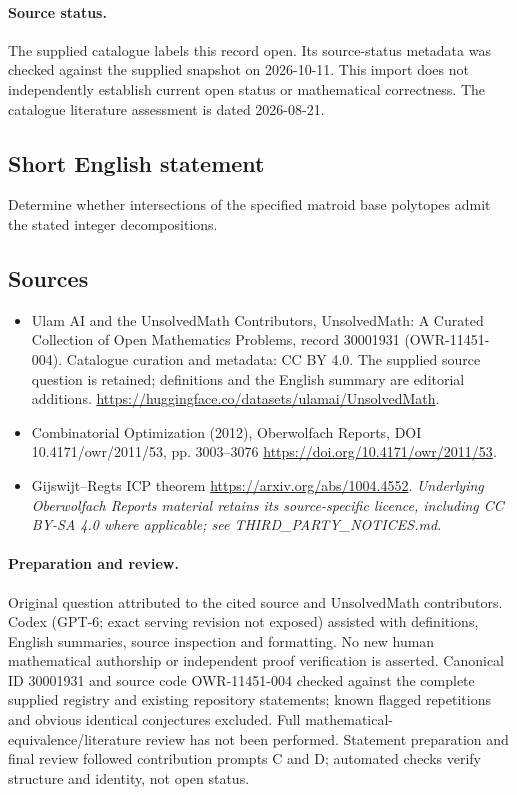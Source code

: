 \documentclass[11pt]{article}
\begin{document}
\paragraph{Source status.}
The supplied catalogue labels this record open. Its source-status metadata was checked against the supplied snapshot on 2026-10-11. This import does not independently establish current open status or mathematical correctness. The catalogue literature assessment is dated 2026-08-21.
\subsection{Short English statement}
Determine whether intersections of the specified matroid base polytopes admit the stated integer decompositions.
\subsection{Sources}
\begin{itemize}
\item[S1] Ulam AI and the UnsolvedMath Contributors, UnsolvedMath: A Curated Collection of Open Mathematics Problems, record 30001931 (OWR-11451-004). Catalogue curation and metadata: CC BY 4.0. The supplied source question is retained; definitions and the English summary are editorial additions.
\url{https://huggingface.co/datasets/ulamai/UnsolvedMath}.
\item[S2] Combinatorial Optimization (2012), Oberwolfach Reports, DOI 10.4171/owr/2011/53, pp. 3003--3076
\url{https://doi.org/10.4171/owr/2011/53}.
\item[S3] Gijswijt--Regts ICP theorem
\url{https://arxiv.org/abs/1004.4552}.
\textit{Underlying Oberwolfach Reports material retains its source-specific licence, including CC BY-SA 4.0 where applicable; see THIRD\_PARTY\_NOTICES.md.}
\end{itemize}
\paragraph{Preparation and review.}
Original question attributed to the cited source and UnsolvedMath contributors. Codex (GPT-6; exact serving revision not exposed) assisted with definitions, English summaries, source inspection and formatting. No new human mathematical authorship or independent proof verification is asserted. Canonical ID 30001931 and source code OWR-11451-004 checked against the complete supplied registry and existing repository statements; known flagged repetitions and obvious identical conjectures excluded. Full mathematical-equivalence/literature review has not been performed. Statement preparation and final review followed contribution prompts C and D; automated checks verify structure and identity, not open status.
\label{end:30001931}
\end{document}
